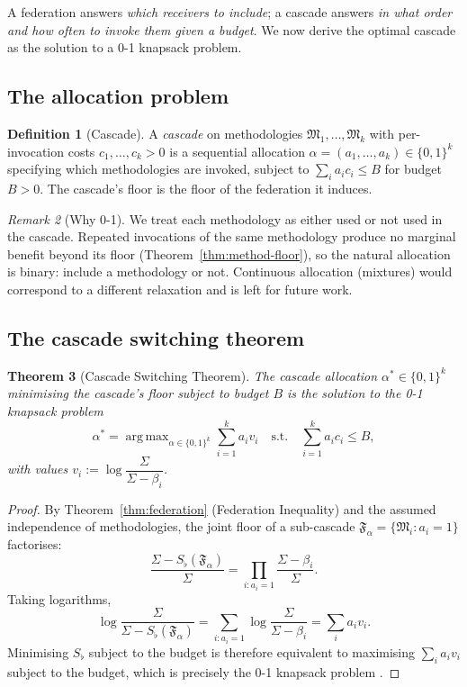 \documentclass[11pt,twocolumn,a4paper]{article}
\newtheorem{theorem}{Theorem}[section]
\theoremstyle{definition}
\newtheorem{definition}[theorem]{Definition}
\theoremstyle{remark}
\newtheorem{remark}[theorem]{Remark}
\DeclareMathOperator*{\argmax}{arg\,max}
\newcommand{\Method}{\mathfrak{M}}
\newcommand{\Federation}{\mathfrak{F}}
\newcommand{\Sigmax}{\Sigma}
\newcommand{\Sfloor}{S_{\flat}}
\begin{document}
A federation answers \emph{which receivers to include}; a cascade answers \emph{in what order and how often to invoke them given a budget}. We now derive the optimal cascade as the solution to a 0-1 knapsack problem.

\subsection{The allocation problem}

\begin{definition}[Cascade]
\label{def:cascade}
A \emph{cascade} on methodologies $\Method_1, \ldots, \Method_k$ with per-invocation costs $c_1, \ldots, c_k > 0$ is a sequential allocation $\alpha = (a_1, \ldots, a_k) \in \{0, 1\}^k$ specifying which methodologies are invoked, subject to $\sum_i a_i c_i \leq B$ for budget $B > 0$. The cascade's floor is the floor of the federation it induces.
\end{definition}

\begin{remark}[Why 0-1]
We treat each methodology as either used or not used in the cascade. Repeated invocations of the same methodology produce no marginal benefit beyond its floor (Theorem~\ref{thm:method-floor}), so the natural allocation is binary: include a methodology or not. Continuous allocation (mixtures) would correspond to a different relaxation and is left for future work.
\end{remark}

\subsection{The cascade switching theorem}

\begin{theorem}[Cascade Switching Theorem]
\label{thm:knapsack}
The cascade allocation $\alpha^* \in \{0, 1\}^k$ minimising the cascade's floor subject to budget $B$ is the solution to the 0-1 knapsack problem
\[
\alpha^* = \argmax_{\alpha \in \{0,1\}^k} \sum_{i=1}^k a_i v_i \quad \text{s.t.} \quad \sum_{i=1}^k a_i c_i \leq B,
\]
with values $v_i := \log\dfrac{\Sigmax}{\Sigmax - \beta_i}$.
\end{theorem}

\begin{proof}
By Theorem~\ref{thm:federation} (Federation Inequality) and the assumed independence of methodologies, the joint floor of a sub-cascade $\Federation_\alpha = \{\Method_i : a_i = 1\}$ factorises:
\[
\frac{\Sigmax - \Sfloor(\Federation_\alpha)}{\Sigmax} = \prod_{i : a_i = 1} \frac{\Sigmax - \beta_i}{\Sigmax}.
\]
Taking logarithms,
\[
\log\frac{\Sigmax}{\Sigmax - \Sfloor(\Federation_\alpha)} = \sum_{i : a_i = 1} \log\frac{\Sigmax}{\Sigmax - \beta_i} = \sum_i a_i v_i.
\]
Minimising $\Sfloor$ subject to the budget is therefore equivalent to maximising $\sum_i a_i v_i$ subject to the budget, which is precisely the 0-1 knapsack problem \citep{dantzig1957discrete,karp1972reducibility,bellman1957dynamic}.
\end{proof}
\end{document}
